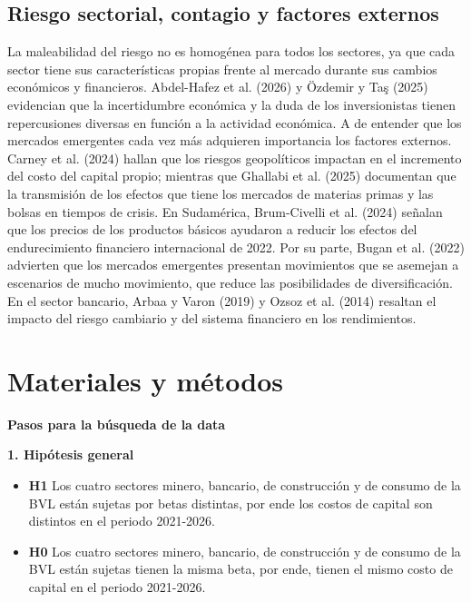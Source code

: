 \documentclass[jrfm,article,submit,oneauthor]{Definitions/mdpi}
\begin{document}
\subsection{Riesgo sectorial, contagio y factores externos}
La maleabilidad del riesgo no es homogénea para todos los sectores, ya que cada sector tiene sus características propias frente al mercado durante sus cambios económicos y financieros. Abdel-Hafez et al. (2026) y Özdemir y Taş (2025) evidencian que la incertidumbre económica y la duda de los inversionistas tienen repercusiones diversas en función a la actividad económica. A de entender que los mercados emergentes cada vez más adquieren importancia los factores externos. Carney et al. (2024) hallan que los riesgos geopolíticos impactan en el incremento del costo del capital propio; mientras que Ghallabi et al. (2025) documentan que la transmisión de los efectos que tiene los mercados de materias primas y las bolsas en tiempos de crisis. En Sudamérica, Brum-Civelli et al. (2024) señalan que los precios de los productos básicos ayudaron a reducir los efectos del endurecimiento financiero internacional de 2022. Por su parte, Bugan et al. (2022) advierten que los mercados emergentes presentan movimientos que se asemejan a escenarios de mucho movimiento, que reduce las posibilidades de diversificación. En el sector bancario, Arbaa y Varon (2019) y Ozsoz et al. (2014) resaltan el impacto del riesgo cambiario y del sistema financiero en los rendimientos.


\section{Materiales y métodos}
\noindent\textbf{Pasos para la búsqueda de la data}

\noindent\textbf{1. Hipótesis general}
\begin{itemize}
\item \textbf{H1} Los cuatro sectores minero, bancario, de construcción y de consumo de la BVL están sujetas por betas distintas, por ende los costos de capital  son distintos en el periodo 2021-2026.
\item \textbf{H0} Los cuatro sectores minero, bancario, de construcción y de consumo de la BVL están sujetas tienen la misma beta, por ende, tienen el mismo costo de capital en el periodo 2021-2026.
\end{itemize}
\end{document}
